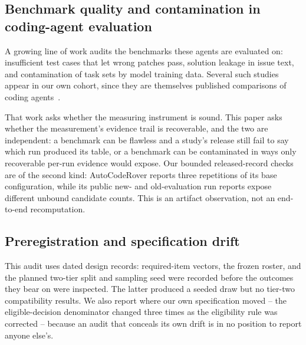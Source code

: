 \subsection{Benchmark quality and contamination in coding-agent evaluation}

A growing line of work audits the benchmarks these agents are evaluated on: insufficient
test cases that let wrong patches pass, solution leakage in issue text, and contamination of
task sets by model training data. Several such studies appear in our own cohort, since they
are themselves published comparisons of coding agents~\cite{UtboostRigorousEvaluation2025,RevisitingSweBench2025}.

That work asks whether the measuring instrument is sound. This paper asks whether the
measurement's evidence trail is recoverable, and the two are independent: a benchmark can be
flawless and a study's release still fail to say which run produced its table, or a benchmark
can be contaminated in ways only recoverable per-run evidence would expose. Our bounded
released-record checks are of the second kind: AutoCodeRover reports three repetitions of its
base configuration, while its public new- and old-evaluation run reports expose different
unbound candidate counts. This is an
artifact observation, not an end-to-end recomputation.

\subsection{Preregistration and specification drift}

This audit uses dated design records: required-item vectors, the frozen roster, and the planned
two-tier split and sampling seed were recorded before the outcomes they bear on were inspected.
The latter produced a seeded draw but no tier-two compatibility results. We also
report where our own specification moved -- the eligible-decision denominator changed three
times as the eligibility rule was corrected -- because an audit that conceals its own drift
is in no position to report anyone else's.
